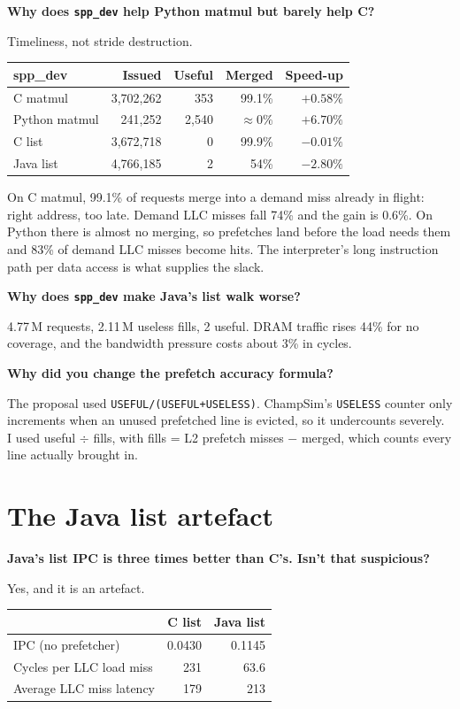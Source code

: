 \documentclass[11pt,a4paper]{article}
\newcommand{\Q}[1]{\begin{question}\textbf{#1}\end{question}}
\begin{document}
\Q{Why does \texttt{spp\_dev} help Python matmul but barely help C?}

Timeliness, not stride destruction.

\begin{center}
\begin{tabular}{lrrrr}
\toprule
\textbf{spp\_dev} & \textbf{Issued} & \textbf{Useful} & \textbf{Merged} & \textbf{Speed-up} \\
\midrule
C matmul      & 3{,}702{,}262 & 353   & 99.1\% & $+0.58\%$ \\
Python matmul & 241{,}252     & 2{,}540 & $\approx 0\%$ & $+6.70\%$ \\
C list        & 3{,}672{,}718 & 0     & 99.9\% & $-0.01\%$ \\
Java list     & 4{,}766{,}185 & 2     & 54\%   & $-2.80\%$ \\
\bottomrule
\end{tabular}
\end{center}

On C matmul, 99.1\% of requests merge into a demand miss already in flight: right address,
too late. Demand LLC misses fall 74\% and the gain is 0.6\%. On Python there is almost no
merging, so prefetches land before the load needs them and 83\% of demand LLC misses become
hits. The interpreter's long instruction path per data access is what supplies the slack.

\Q{Why does \texttt{spp\_dev} make Java's list walk worse?}

4.77\,M requests, 2.11\,M useless fills, 2 useful. DRAM traffic rises 44\% for no coverage,
and the bandwidth pressure costs about 3\% in cycles.

\Q{Why did you change the prefetch accuracy formula?}

The proposal used \texttt{USEFUL/(USEFUL+USELESS)}. ChampSim's \texttt{USELESS} counter only
increments when an unused prefetched line is evicted, so it undercounts severely. I used
useful $\div$ fills, with fills = L2 prefetch misses $-$ merged, which counts every line
actually brought in.

\section{The Java list artefact}
\label{sec:javalist}

\Q{Java's list IPC is three times better than C's. Isn't that suspicious?}

Yes, and it is an artefact.

\begin{center}
\begin{tabular}{lrr}
\toprule
& \textbf{C list} & \textbf{Java list} \\
\midrule
IPC (no prefetcher)        & 0.0430 & 0.1145 \\
Cycles per LLC load miss   & 231    & 63.6 \\
Average LLC miss latency   & 179    & 213 \\
\bottomrule
\end{tabular}
\end{center}
\end{document}
